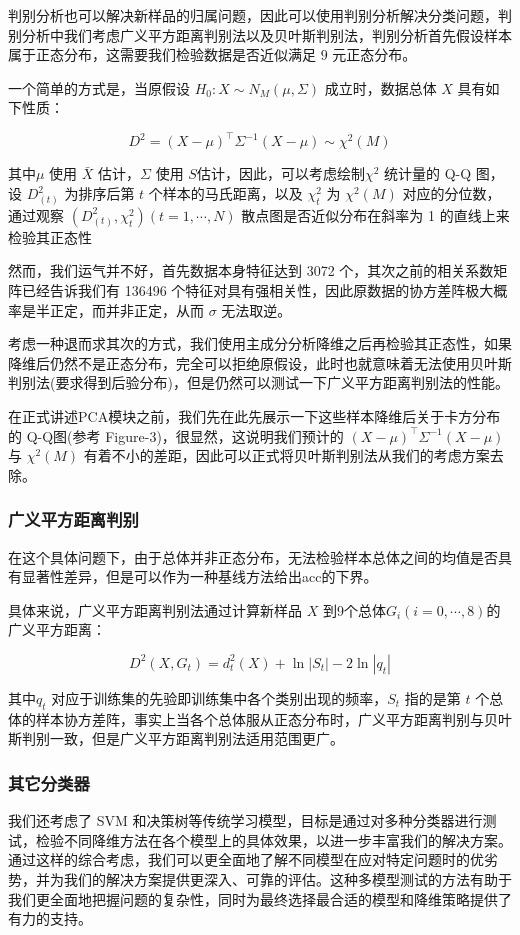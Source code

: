 \documentclass[fleqn]{Paquetes/RevDigMatEduInt}
\begin{document}
判别分析也可以解决新样品的归属问题，因此可以使用判别分析解决分类问题，判别分析中我们考虑广义平方距离判别法以及贝叶斯判别法，判别分析首先假设样本属于正态分布，这需要我们检验数据是否近似满足 $9$ 元正态分布。


一个简单的方式是，当原假设 $H_0:X\sim N_M(\mu,\Sigma)$ 成立时，数据总体 $X$ 具有如下性质：

\begin{lema}
	$$D^2 = (X - \mu)^\top \Sigma^{-1} (X - \mu) \sim \chi^2(M)$$
\end{lema}

其中$\mu$ 使用 $\bar{X}$ 估计，$\Sigma$ 使用 $S $估计，因此，可以考虑绘制$\chi^2$ 统计量的 Q-Q 图，设 $D_{(t)}^2$ 为排序后第 $t$ 个样本的马氏距离，以及 $\chi_t^2$ 为 $\chi^2(M)$ 对应的分位数，通过观察 $(D_{(t)}^2,\chi_t^2)(t = 1,\cdots,N)$ 散点图是否近似分布在斜率为 1 的直线上来检验其正态性

然而，我们运气并不好，首先数据本身特征达到 3072 个，其次之前的相关系数矩阵已经告诉我们有 136496 个特征对具有强相关性，因此原数据的协方差阵极大概率是半正定，而并非正定，从而 $\sigma$ 无法取逆。

考虑一种退而求其次的方式，我们使用主成分分析降维之后再检验其正态性，如果降维后仍然不是正态分布，完全可以拒绝原假设，此时也就意味着无法使用贝叶斯判别法(要求得到后验分布)，但是仍然可以测试一下广义平方距离判别法的性能。

在正式讲述PCA模块之前，我们先在此先展示一下这些样本降维后关于卡方分布的 Q-Q图(参考 Figure-3)，很显然，这说明我们预计的 $ (X - \mu)^\top \Sigma^{-1} (X - \mu)$ 与 $\chi^2(M)$ 有着不小的差距，因此可以正式将贝叶斯判别法从我们的考虑方案去除。

\subsubsection{广义平方距离判别}
在这个具体问题下，由于总体并非正态分布，无法检验样本总体之间的均值是否具有显著性差异，但是可以作为一种基线方法给出acc的下界。

具体来说，广义平方距离判别法通过计算新样品 $X$ 到9个总体$G_i(i=0,\cdots,8)$的广义平方距离：



$$
D^2(X,G_t) = d_t^2(X) + \ln |S_t| - 2\ln | q_t| 
$$

其中$q_t$ 对应于训练集的先验即训练集中各个类别出现的频率，$S_t$ 指的是第 $t$ 个总体的样本协方差阵，事实上当各个总体服从正态分布时，广义平方距离判别与贝叶斯判别一致，但是广义平方距离判别法适用范围更广。
 
\subsubsection{其它分类器}
我们还考虑了 SVM 和决策树等传统学习模型，目标是通过对多种分类器进行测试，检验不同降维方法在各个模型上的具体效果，以进一步丰富我们的解决方案。通过这样的综合考虑，我们可以更全面地了解不同模型在应对特定问题时的优劣势，并为我们的解决方案提供更深入、可靠的评估。这种多模型测试的方法有助于我们更全面地把握问题的复杂性，同时为最终选择最合适的模型和降维策略提供了有力的支持。
\end{document}
